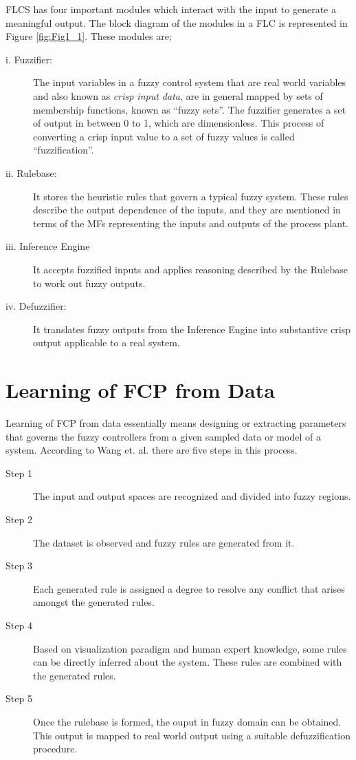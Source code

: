 FLCS has four important modules which interact with the input to generate a meaningful output\cite{Wang1997,bookMichels2006,Mendel1995}. The block diagram of the modules in a FLC is represented in Figure \ref{fig:Fig1_1}. These modules are;
\begin{description}
	\item[i. Fuzzifier:] The input variables in a fuzzy control system that are real world variables and also known as \textit{crisp input data}, are in general mapped by sets of membership functions, known as ``fuzzy sets''. The fuzzifier generates a set of output in between 0 to 1, which are dimensionless. This process of converting a crisp input value to a set of fuzzy values is called ``fuzzification''.
	\item[ii. Rulebase:] It stores the heuristic rules that govern a typical fuzzy system. These rules describe the output dependence of the inputs, and they are  mentioned in terms of the MFs representing the inputs and outputs of the process plant.
	\item[iii. Inference Engine] It accepts fuzzified inputs and applies reasoning described by the Rulebase to work out fuzzy outputs.
	\item[iv. Defuzzifier:] It translates fuzzy outputs from the Inference Engine into substantive crisp output applicable to a real system.
\end{description}


\section{Learning of FCP from Data} \label{sec:learnFCP}

Learning of FCP from data essentially means designing or extracting parameters that governs the fuzzy controllers from a given sampled data or model of a system. According to Wang et. al. \cite{Wang1992a} there are five steps in this process. 
\begin{description}
	\item[Step 1] The input and output spaces are recognized and divided into fuzzy regions.
	\item[Step 2] The dataset is observed and fuzzy rules are generated from it.
	\item[Step 3] Each generated rule is assigned a degree to resolve any conflict that arises amongst the generated rules.
	\item[Step 4] Based on visualization paradigm and human expert knowledge, some rules can be directly inferred about the system. These rules are combined with the generated rules.
	\item[Step 5] Once the rulebase is formed, the ouput in fuzzy domain can be obtained. This output is mapped to real world output using a suitable defuzzification procedure. 
\end{description}

